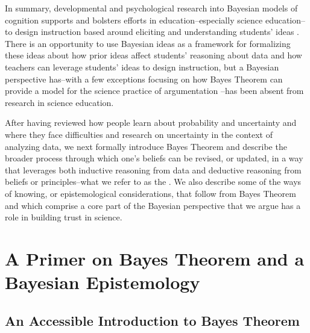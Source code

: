 \documentclass[man]{apa7}
\begin{document}
In summary, developmental and psychological research into Bayesian models of cognition supports and bolsters efforts in education--especially science education--to design instruction based around eliciting and understanding students’ ideas \parencite{gb16, hbavb20, wtbs12}. There is an opportunity to use Bayesian ideas as a framework for formalizing these ideas about how prior ideas affect students’ reasoning about data and how teachers can leverage students’ ideas to design instruction, but a Bayesian perspective has--with a few exceptions focusing on how Bayes Theorem can provide a model for the science practice of argumentation \parencite[e.g., ][]{n11, so12}--has been absent from research in science education.

After having reviewed how people learn about probability and uncertainty and where they face difficulties and research on uncertainty in the context of analyzing data, we next formally introduce Bayes Theorem and describe the broader process through which one's beliefs can be revised, or updated, in a way that leverages both inductive reasoning from data and deductive reasoning from beliefs or principles--what we refer to as the . We also describe some of the ways of knowing, or epistemological considerations, that follow from Bayes Theorem and which comprise a core part of the Bayesian perspective that we argue has a role in building trust in science.

\section{A Primer on Bayes Theorem and a Bayesian Epistemology}

\subsection{An Accessible Introduction to Bayes Theorem}
\end{document}
